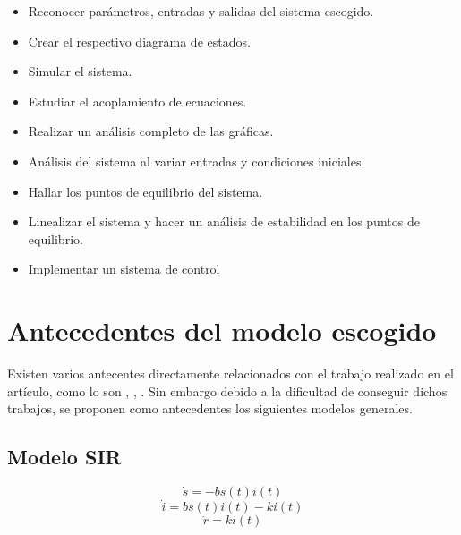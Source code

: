 \documentclass{article}
\begin{document}
\begin{itemize}
    \item Reconocer parámetros, entradas y salidas del sistema escogido.
    \item Crear el respectivo diagrama de estados.
    \item Simular el sistema.
    \item Estudiar el acoplamiento de ecuaciones.
    \item Realizar un análisis completo de las gráficas.
    \item Análisis del sistema al variar entradas y condiciones iniciales.
    \item Hallar los puntos de equilibrio del sistema.
    \item Linealizar el sistema y hacer un análisis de estabilidad en los puntos de equilibrio.
    \item Implementar un sistema de control
\end{itemize}

\section{Antecedentes del modelo escogido}

Existen varios antecentes directamente relacionados con el trabajo realizado en el
artículo, como lo son \cite{ieee1}, \cite{ieee2}, \cite{ieee3}. Sin embargo
debido a la dificultad de conseguir dichos trabajos, se proponen como
antecedentes los siguientes modelos generales.

\newpage

    \subsection{Modelo SIR}

        \Large
        $$\dot{s} = -b s(t) i(t)$$
        $$\dot{i} = b s(t) i(t) - k i(t)$$
        $$\dot{r} = k i(t)$$
        \normalsize

        \vspace{0.5cm}
\end{document}
